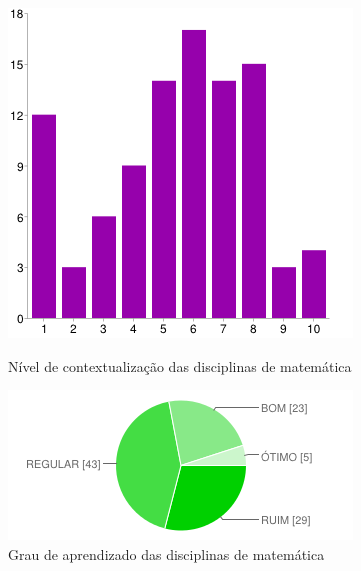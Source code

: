 \documentclass[12pt,a4paper]{article}
\begin{document}
\begin{figure}[!h]
\centering
\includegraphics[scale=0.36]{imagens/fig5.png} 
\caption{Nível de contextualização das disciplinas de matemática}
\includegraphics[scale=0.75]{imagens/fig6.png} 
\caption{Grau de aprendizado das disciplinas de matemática}
\end{figure}
\end{document}
